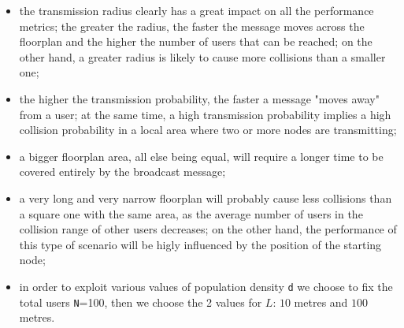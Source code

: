 \begin{itemize}
    \item the transmission radius clearly has a great impact on all the
    performance metrics; the greater the radius, the faster the message moves
    across the floorplan and the higher the number of users that can be reached;
    on the other hand, a greater radius is likely to cause more collisions than
    a smaller one;
    \item the higher the transmission probability, the faster a message "moves
    away" from a user; at the same time, a high transmission probability implies
    a high collision probability in a local area where two or more nodes are
    transmitting;
    \item a bigger floorplan area, all else being equal, will require a longer
    time to be covered entirely by the broadcast message;
    \item a very long and very narrow floorplan will probably cause less
    collisions than a square one with the same area, as the average number of
    users in the collision range of other users decreases; on the other hand,
    the performance of this type of scenario will be higly influenced by the
    position of the starting node;
    \item in order to exploit various values of  population density \texttt{d}
	we choose to fix the total users \texttt{N}=100, then we choose the 2 values
	for $L$: $10$ metres and $100$ metres.
\end{itemize}


